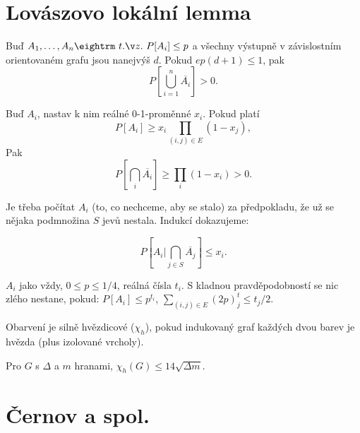 \section{Lovászovo lokální lemma}

 Buď $A_1, \dots, A_n \st P[A_i] \le p$ a všech\-ny vý\-stup\-ně v zá\-vi\-slostním
orientovaném grafu jsou nanejvýš $d$. Pokud $ep(d+1) \le 1$, pak 
$$P[\bigcup_{i=1}^n \overline{A_i}] > 0.$$

 Buď $A_i$, nastav k nim reálné 0-1-proměnné $x_i$. Pokud platí
$$P[A_i] \ge x_i \prod_{(i,j) \in E} (1-x_j), $$
Pak
$$P[\bigcap_i \overline{A_i}] \ge \prod_i (1-x_i) > 0.$$

\prf{} Je třeba počítat $A_i$ (to, co nechceme, aby se stalo) za předpokladu, že
už se nějaka podmnožina $S$ jevů nestala. Indukcí dokazujeme:

$$ P[A_i|\bigcap_{j \in S} \overline{A_j}] \le x_i.$$


 $A_i$ jako vždy, $0 \le p \le 1/4$, reálná čísla $t_i$.
S kladnou pravděpodobností se nic zlého nestane, pokud:
\itemize\ibull
\: $P[A_i] \le p^{t_i}$,
\: $\sum_{(i,j) \in E} (2p)^t_j \le t_j /2$.
\endlist

\dfn Obarvení je {\I silně hvězdicové} ($\chi_h$), pokud indukovaný graf každých dvou barev
je hvězda (plus izolované vrcholy).

\thm{} Pro $G$ s $\Delta$ a $m$ hranami, $\chi_h(G) \le 14 \sqrt{\Delta m}$.

\prf{} 

\section{Černov a spol.}

\bye
